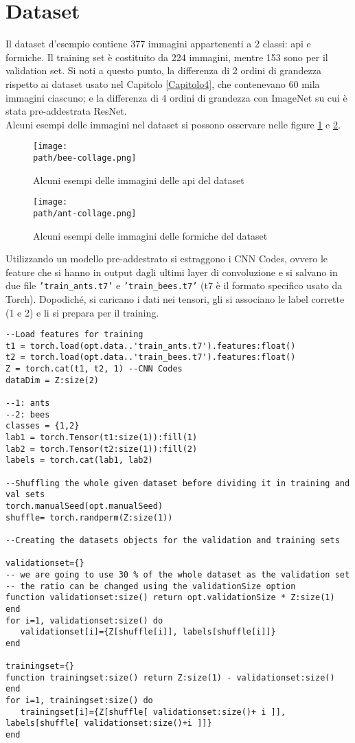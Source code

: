 \section{Dataset}
Il dataset d'esempio contiene 377 immagini appartenenti a 2 classi: api e formiche. Il training set è costituito da 224 immagini, mentre 153 sono per il validation set. Si noti a questo punto, la differenza di 2 ordini di grandezza rispetto ai dataset usato nel Capitolo \ref{Capitolo4}, che contenevano 60 mila immagini ciascuno; e la differenza di 4 ordini di grandezza con ImageNet su cui è stata pre-addestrata ResNet. \\
Alcuni esempi delle immagini nel dataset si possono osservare nelle figure \ref{fig:bee} e \ref{fig:ant}. 
\begin{figure}[h!]
 \centering
 \texttt{[image: \\path/bee-collage.png]} 
 \caption{Alcuni esempi delle immagini delle api del dataset}
 \label{fig:bee}
\end{figure}
\begin{figure}[h!]
 \centering
 \texttt{[image: \\path/ant-collage.png]} 
 \caption{Alcuni esempi delle immagini delle formiche del dataset}
 \label{fig:ant}
\end{figure}

Utilizzando un modello pre-addestrato si estraggono i CNN Codes, ovvero le feature che si hanno in output dagli ultimi layer di convoluzione e si salvano in due file \texttt{'train\_ants.t7'} e \texttt{'train\_bees.t7'} (t7 è il formato specifico usato da Torch). Dopodiché, si caricano i dati nei tensori, gli si associano le label corrette (1 e 2) e li si prepara per il training. 


\begin{lstlisting}[language={[5.2]Lua}]
--Load features for training
t1 = torch.load(opt.data..'train_ants.t7').features:float()
t2 = torch.load(opt.data..'train_bees.t7').features:float()
Z = torch.cat(t1, t2, 1) --CNN Codes
dataDim = Z:size(2)

--1: ants
--2: bees
classes = {1,2}
lab1 = torch.Tensor(t1:size(1)):fill(1)
lab2 = torch.Tensor(t2:size(1)):fill(2)
labels = torch.cat(lab1, lab2)

--Shuffling the whole given dataset before dividing it in training and val sets
torch.manualSeed(opt.manualSeed)
shuffle= torch.randperm(Z:size(1))

--Creating the datasets objects for the validation and training sets

validationset={}
-- we are going to use 30 % of the whole dataset as the validation set
-- the ratio can be changed using the validationSize option
function validationset:size() return opt.validationSize * Z:size(1) end
for i=1, validationset:size() do
   validationset[i]={Z[shuffle[i]], labels[shuffle[i]]}
end

trainingset={}
function trainingset:size() return Z:size(1) - validationset:size() end
for i=1, trainingset:size() do
   trainingset[i]={Z[shuffle[ validationset:size()+ i ]], labels[shuffle[ validationset:size()+i ]]}
end
\end{lstlisting}



